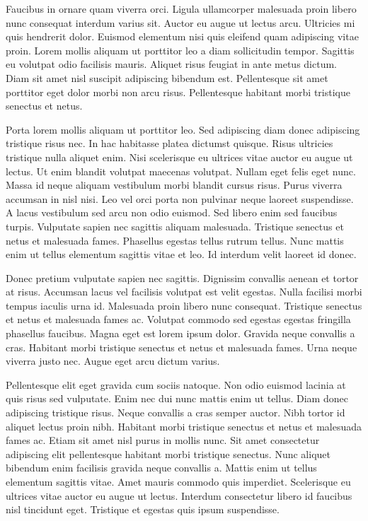 \documentclass[11pt,a4paper]{article}
\begin{document}
Faucibus in ornare quam viverra orci. Ligula ullamcorper malesuada proin libero nunc consequat interdum varius sit. Auctor eu augue ut lectus arcu. Ultricies mi quis hendrerit dolor. Euismod elementum nisi quis eleifend quam adipiscing vitae proin. Lorem mollis aliquam ut porttitor leo a diam sollicitudin tempor. Sagittis eu volutpat odio facilisis mauris. Aliquet risus feugiat in ante metus dictum. Diam sit amet nisl suscipit adipiscing bibendum est. Pellentesque sit amet porttitor eget dolor morbi non arcu risus. Pellentesque habitant morbi tristique senectus et netus.

Porta lorem mollis aliquam ut porttitor leo. Sed adipiscing diam donec adipiscing tristique risus nec. In hac habitasse platea dictumst quisque. Risus ultricies tristique nulla aliquet enim. Nisi scelerisque eu ultrices vitae auctor eu augue ut lectus. Ut enim blandit volutpat maecenas volutpat. Nullam eget felis eget nunc. Massa id neque aliquam vestibulum morbi blandit cursus risus. Purus viverra accumsan in nisl nisi. Leo vel orci porta non pulvinar neque laoreet suspendisse. A lacus vestibulum sed arcu non odio euismod. Sed libero enim sed faucibus turpis. Vulputate sapien nec sagittis aliquam malesuada. Tristique senectus et netus et malesuada fames. Phasellus egestas tellus rutrum tellus. Nunc mattis enim ut tellus elementum sagittis vitae et leo. Id interdum velit laoreet id donec.

Donec pretium vulputate sapien nec sagittis. Dignissim convallis aenean et tortor at risus. Accumsan lacus vel facilisis volutpat est velit egestas. Nulla facilisi morbi tempus iaculis urna id. Malesuada proin libero nunc consequat. Tristique senectus et netus et malesuada fames ac. Volutpat commodo sed egestas egestas fringilla phasellus faucibus. Magna eget est lorem ipsum dolor. Gravida neque convallis a cras. Habitant morbi tristique senectus et netus et malesuada fames. Urna neque viverra justo nec. Augue eget arcu dictum varius.

Pellentesque elit eget gravida cum sociis natoque. Non odio euismod lacinia at quis risus sed vulputate. Enim nec dui nunc mattis enim ut tellus. Diam donec adipiscing tristique risus. Neque convallis a cras semper auctor. Nibh tortor id aliquet lectus proin nibh. Habitant morbi tristique senectus et netus et malesuada fames ac. Etiam sit amet nisl purus in mollis nunc. Sit amet consectetur adipiscing elit pellentesque habitant morbi tristique senectus. Nunc aliquet bibendum enim facilisis gravida neque convallis a. Mattis enim ut tellus elementum sagittis vitae. Amet mauris commodo quis imperdiet. Scelerisque eu ultrices vitae auctor eu augue ut lectus. Interdum consectetur libero id faucibus nisl tincidunt eget. Tristique et egestas quis ipsum suspendisse.
\end{document}
